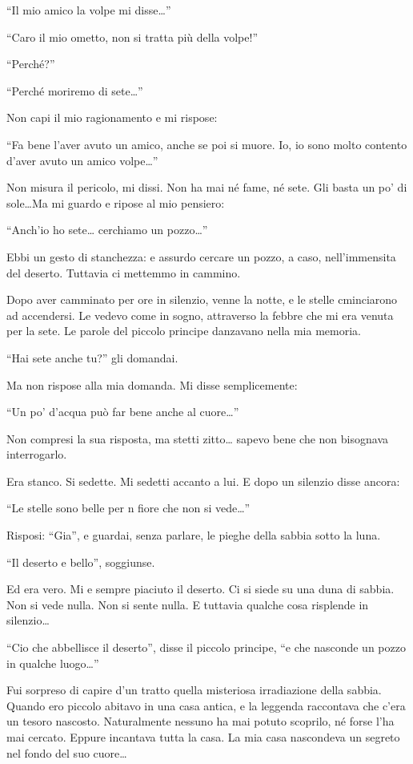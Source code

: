 \documentclass[11pt]{scrbook}
\begin{document}
``Il mio amico la volpe mi disse\ldots{}''

``Caro il mio ometto, non si tratta più della volpe!''

``Perché?''

``Perché moriremo di sete\ldots{}''

Non capi il mio ragionamento e mi rispose:

``Fa bene l'aver avuto un amico, anche se poi si muore. Io, io sono
molto contento d'aver avuto un amico volpe\ldots{}''

Non misura il pericolo, mi dissi. Non ha mai né fame, né sete. Gli basta
un po' di sole\ldots{}Ma mi guardo e ripose al mio pensiero:

``Anch'io ho sete\ldots{} cerchiamo un pozzo\ldots{}''

Ebbi un gesto di stanchezza: e assurdo cercare un pozzo, a caso,
nell'immensita del deserto. Tuttavia ci mettemmo in cammino.

Dopo aver camminato per ore in silenzio, venne la notte, e le stelle
cminciarono ad accendersi. Le vedevo come in sogno, attraverso la febbre
che mi era venuta per la sete. Le parole del piccolo principe danzavano
nella mia memoria.

``Hai sete anche tu?'' gli domandai.

Ma non rispose alla mia domanda. Mi disse semplicemente:

``Un po' d'acqua può far bene anche al cuore\ldots{}''

Non compresi la sua risposta, ma stetti zitto\ldots{} sapevo bene che
non bisognava interrogarlo.

Era stanco. Si sedette. Mi sedetti accanto a lui. E dopo un silenzio
disse ancora:

``Le stelle sono belle per n fiore che non si vede\ldots{}''

Risposi: ``Gia'', e guardai, senza parlare, le pieghe della sabbia sotto
la luna.

``Il deserto e bello'', soggiunse.

Ed era vero. Mi e sempre piaciuto il deserto. Ci si siede su una duna di
sabbia. Non si vede nulla. Non si sente nulla. E tuttavia qualche cosa
risplende in silenzio\ldots{}

``Cio che abbellisce il deserto'', disse il piccolo principe, ``e che
nasconde un pozzo in qualche luogo\ldots{}''

Fui sorpreso di capire d'un tratto quella misteriosa irradiazione della
sabbia. Quando ero piccolo abitavo in una casa antica, e la leggenda
raccontava che c'era un tesoro nascosto. Naturalmente nessuno ha mai
potuto scoprilo, né forse l'ha mai cercato. Eppure incantava tutta la
casa. La mia casa nascondeva un segreto nel fondo del suo cuore\ldots{}
\end{document}
